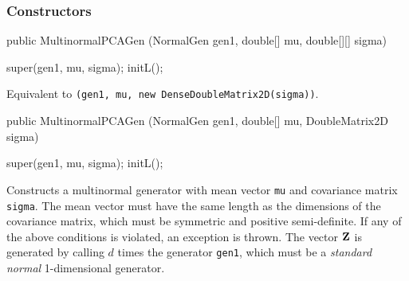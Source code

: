 \subsubsection* {Constructors}
\begin{code}

   public MultinormalPCAGen (NormalGen gen1, double[] mu, double[][] sigma)\begin{hide} {
      super(gen1, mu, sigma);
      initL();
   }\end{hide}
\end{code}
\begin{tabb}   Equivalent to
 \texttt{(gen1, mu, new DenseDoubleMatrix2D(sigma))}.
\end{tabb}
\begin{code}

   public MultinormalPCAGen (NormalGen gen1, double[] mu,
                             DoubleMatrix2D sigma)\begin{hide} {
      super(gen1, mu, sigma);
      initL();
   }\end{hide}
\end{code}
\begin{tabb} Constructs a multinormal generator with mean vector \texttt{mu}
 and covariance matrix \texttt{sigma}. The mean vector must have the same
 length as the dimensions of the covariance matrix, which must be symmetric
 and positive semi-definite.
 If any of the above conditions is violated, an exception is thrown.
 The vector $\textbf{Z}$ is generated by calling $d$ times the generator \texttt{gen1},
 which must be a \emph{standard normal} 1-dimensional generator.
\end{tabb}
\begin{htmlonly}
\end{htmlonly}


